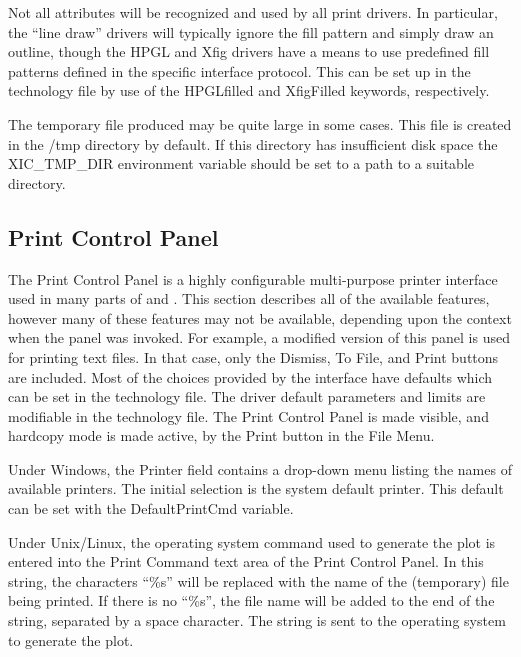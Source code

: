 Not all attributes will be recognized and used by all print drivers. 
In particular, the ``line draw'' drivers will typically ignore the
fill pattern and simply draw an outline, though the HPGL and Xfig
drivers have a means to use predefined fill patterns defined in the
specific interface protocol.  This can be set up in the technology
file by use of the {\vt HPGLfilled} and {\vt XfigFilled} keywords,
respectively.

The temporary file produced may be quite large in some cases.  This
file is created in the {\vt /tmp} directory by default.  If this
directory has insufficient disk space the {\et XIC\_TMP\_DIR}
environment variable should be set to a path to a suitable directory.


\subsection{Print Control Panel}

The {\cb Print Control Panel} is a highly configurable multi-purpose
printer interface used in many parts of {\Xic} and {\WRspice}.  This
section describes all of the available features, however many of these
features may not be available, depending upon the context when the
panel was invoked.  For example, a modified version of this panel is
used for printing text files.  In that case, only the {\cb Dismiss},
{\cb To File}, and {\cb Print} buttons are included.  Most of the
choices provided by the interface have defaults which can be set in
the technology file.  The driver default parameters and limits are
modifiable in the technology file.  The {\cb Print Control Panel} is
made visible, and hardcopy mode is made active, by the {\cb Print}
button in the {\cb File Menu}.

Under Windows, the {\cb Printer} field contains a drop-down menu
listing the names of available printers.  The initial selection is the
system default printer.  This default can be set with the {\et
DefaultPrintCmd} variable.

Under Unix/Linux, the operating system command used to generate the
plot is entered into the {\cb Print Command} text area of the {\cb
Print Control Panel}.  In this string, the characters ``{\vt \%s}''
will be replaced with the name of the (temporary) file being printed. 
If there is no ``{\vt \%s}'', the file name will be added to the end
of the string, separated by a space character.  The string is sent to
the operating system to generate the plot.

